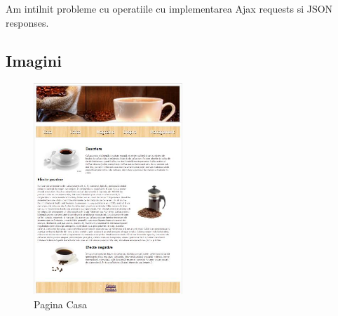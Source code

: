 Am intilnit probleme cu operatiile cu implementarea Ajax requests si JSON responses.  
 



\subsection{Imagini}




\begin{figure}[!ht]
	
	\centering
	
	\includegraphics[width=0.5\textwidth]{Cattura.JPG}
	
	\caption{Pagina Casa}
	
	\label{Im_label}
	
\end{figure}

